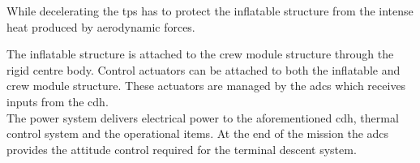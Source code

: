 While decelerating the \gls{tps} has to protect the inflatable structure from the intense heat produced by aerodynamic forces. %

The inflatable structure is attached to the crew module structure through the rigid centre body. Control actuators can be attached to both the inflatable and crew module structure. These actuators are managed by the \gls{adcs} which receives inputs from the \gls{cdh}.\\
The power system delivers electrical power to the aforementioned \gls{cdh}, thermal control system and the operational items. At the end of the mission the \gls{adcs} provides the attitude control required for the terminal descent system.